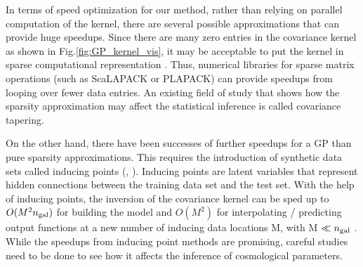 In terms of speed optimization for our method, rather than relying on 
parallel computation of the kernel, there are several 
possible approximations that can provide huge speedups. 
Since there are many zero entries in the covariance kernel as shown in
Fig.\ref{fig:GP_kernel_vis}, it may be acceptable to put the kernel in sparse
computational representation \citep{Snelson2007}. 
Thus, numerical libraries for sparse matrix 
operations (such as {\sc ScaLAPACK} or {\sc PLAPACK})
can provide speedups from looping over fewer data entries. 
An existing field of study that shows how the sparsity
approximation may affect the statistical inference is called covariance tapering. 

On the other hand, there have been successes of further speedups for a GP than
pure sparsity approximations. This requires the introduction of  
 synthetic data sets called inducing points (\citealt{Snelson2006},
\citealt{Rasmussen2006}). Inducing points are latent variables that represent
hidden connections between the training data set and the test set. 
With the help 
of inducing points,
the inversion of the covariance kernel can be sped up to
$O(M^2 n_{\rm gal})$ for
building the model and $O(M^2)$ for interpolating / predicting output functions
at a new number of inducing data locations M, with M $\ll n_{\rm gal}$ 
\citep{Snelson2006}. While the speedups from inducing point methods are
promising, careful studies need to be done to see how it affects the
inference of cosmological parameters. 
  
